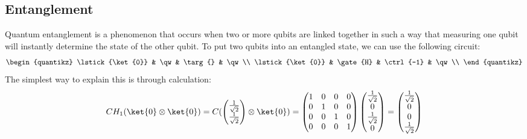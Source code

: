 \documentclass[a4paper, 11pt]{article}
\begin{document}
    \subsection{Entanglement} %
    Quantum entanglement is a phenomenon that occurs when two or more qubits are linked together in such a way that measuring one qubit will instantly determine the state of the other qubit.
    To put two qubits into an entangled state, we can use the following circuit:
    \[
        \begin{quantikz}
            \lstick{\ket{0}} & \qw & \targ{} & \qw\\
            \lstick{\ket{0}} & \gate{H} & \ctrl{-1} & \qw\\
        \end{quantikz}
    \]
    The simplest way to explain this is through calculation:
    \[
        C H_{1} (\ket{0} \otimes \ket{0}) =
        C (
        \begin{pmatrix}
            \frac{1}{\sqrt{2}} \\
            \frac{1}{\sqrt{2}} \\
        \end{pmatrix}
        \otimes
        \ket{0}
        ) = 
        \begin{pmatrix}
            1 & 0 & 0 & 0 \\
            0 & 1 & 0 & 0 \\
            0 & 0 & 1 & 0 \\
            0 & 0 & 0 & 1 \\
        \end{pmatrix}
        \begin{pmatrix}
            \frac{1}{\sqrt{2}} \\
            0 \\
            \frac{1}{\sqrt{2}} \\
            0 \\
        \end{pmatrix} =
        \begin{pmatrix}
            \frac{1}{\sqrt{2}} \\
            0 \\
            0 \\
            \frac{1}{\sqrt{2}} \\
        \end{pmatrix}
    \]
\end{document}
